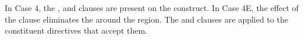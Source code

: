 In Case 4, the ,  and  clauses are present on 
the  construct. 
In Case 4E, the effect of the  clause eliminates the  around 
the  region. 
The  and  clauses are applied to the constituent directives that 
accept them. 

